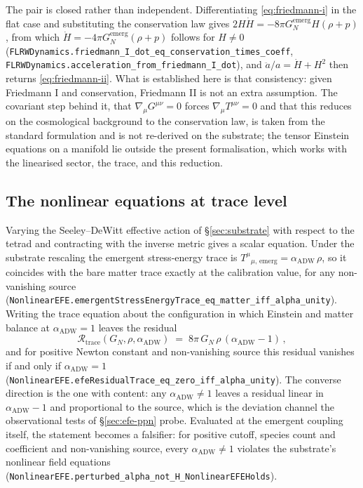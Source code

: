 \documentclass[aps,prd,nofootinbib,superscriptaddress,12pt]{revtex4-2}
\DeclareRobustCommand{\lb}{\discretionary{}{}{}}
\begin{document}
The pair is closed rather than independent. Differentiating
\eqref{eq:friedmann-i} in the flat case and substituting the conservation law
gives $2H\dot H = -8\pi G_N^{\mathrm{emerg}} H(\rho+p)$, from which
$\dot H = -4\pi G_N^{\mathrm{emerg}}(\rho+p)$ follows for $H \neq 0$
(\texttt{FLRWDynamics.\lb{}friedmann\_\lb{}I\_\lb{}dot\_\lb{}eq\_\lb{}conservation\_\lb{}times\_\lb{}coeff},
\texttt{FLRWDynamics.\lb{}acceleration\_\lb{}from\_\lb{}friedmann\_\lb{}I\_\lb{}dot}), and
$\ddot a/a = \dot H + H^{2}$ then returns \eqref{eq:friedmann-ii}. What is
established here is that consistency: given Friedmann I and conservation,
Friedmann II is not an extra assumption. The covariant step behind it, that
$\nabla_{\mu}G^{\mu\nu} = 0$ forces $\nabla_{\mu}T^{\mu\nu} = 0$ and that this
reduces on the cosmological background to the conservation law, is taken from
the standard formulation and is not re-derived on the substrate; the tensor
Einstein equations on a manifold lie outside the present formalisation, which
works with the linearised sector, the trace, and this reduction.

\subsection{The nonlinear equations at trace level}
\label{sec:efe-nonlinear}

Varying the Seeley--DeWitt effective action of \S\ref{sec:substrate} with
respect to the tetrad and contracting with the inverse metric gives a scalar
equation. Under the substrate rescaling the emergent stress-energy trace is
$T^{\mu}{}_{\mu,\,\mathrm{emerg}} = \alpha_{\mathrm{ADW}}\,\rho$, so it
coincides with the bare matter trace exactly at the calibration value, for any
non-vanishing source
(\texttt{Nonlinear\lb{}EFE.\lb{}emergent\lb{}Stress\lb{}Energy\lb{}Trace\_\lb{}eq\_\lb{}matter\_\lb{}iff\_\lb{}alpha\_\lb{}unity}).
Writing the trace equation about the configuration in which Einstein and matter
balance at $\alpha_{\mathrm{ADW}} = 1$ leaves the residual
\begin{equation}
\label{eq:efe-residual}
\mathcal{R}_{\mathrm{trace}}(G_N, \rho, \alpha_{\mathrm{ADW}})
\;=\; 8\pi\,G_N\,\rho\,(\alpha_{\mathrm{ADW}} - 1)\,,
\end{equation}
and for positive Newton constant and non-vanishing source this residual
vanishes if and only if $\alpha_{\mathrm{ADW}} = 1$
(\texttt{Nonlinear\lb{}EFE.\lb{}efe\lb{}Residual\lb{}Trace\_\lb{}eq\_\lb{}zero\_\lb{}iff\_\lb{}alpha\_\lb{}unity}). The
converse direction is the one with content: any $\alpha_{\mathrm{ADW}} \neq 1$
leaves a residual linear in $\alpha_{\mathrm{ADW}} - 1$ and proportional to the
source, which is the deviation channel the observational tests of
\S\ref{sec:efe-ppn} probe. Evaluated at the emergent coupling itself, the
statement becomes a falsifier: for positive cutoff, species count and
coefficient and non-vanishing source, every $\alpha_{\mathrm{ADW}} \neq 1$
violates the substrate's nonlinear field equations
(\texttt{Nonlinear\lb{}EFE.\lb{}perturbed\_\lb{}alpha\_\lb{}not\_\lb{}H\_\lb{}Nonlinear\lb{}EFEHolds}).
\end{document}

